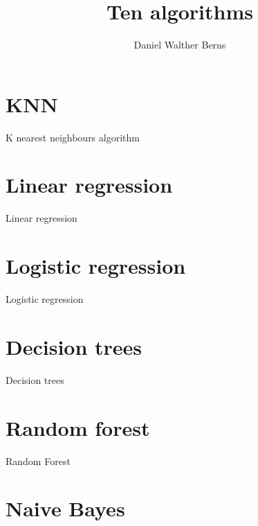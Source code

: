 \documentclass[10pt,a4paper]{article}
\author{Daniel Walther Berns}
\title{Ten algorithms}
\begin{document}
	\maketitle
	\section{KNN}
    
    K nearest neighbours algorithm
    
    \section{Linear regression}
    
    Linear regression
    
    \section{Logistic regression}
    
    Logistic regression
    
    \section{Decision trees}
    
    Decision trees
    
    \section{Random forest}
    
    Random Forest
    
    \section{Naive Bayes}
    
\end{document}

